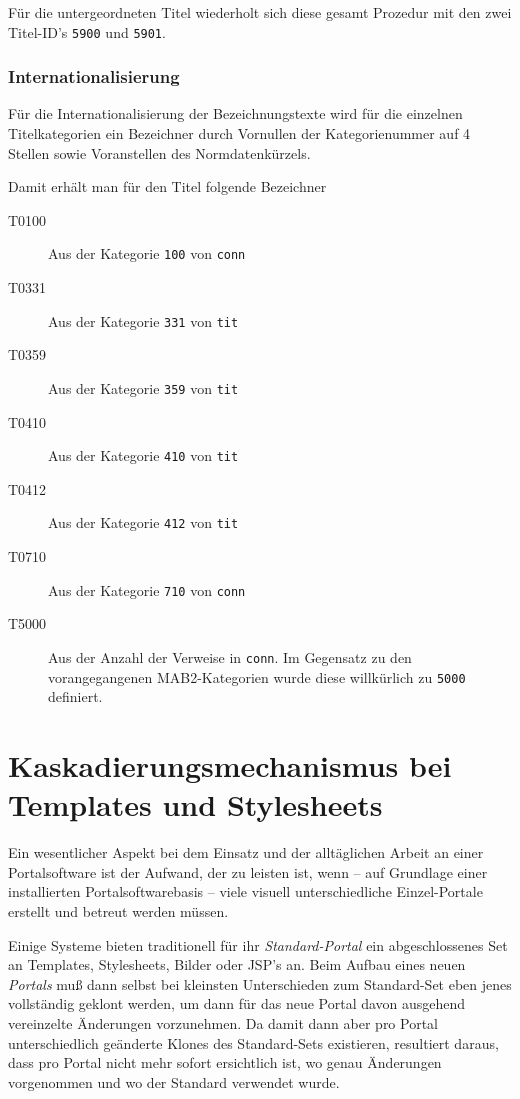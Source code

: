 \documentclass[11pt, twoside, a4paper, BCOR8mm, DIV12, bibtotoc,idxtotoc]{scrbook}
\begin{document}
Für die untergeordneten Titel wiederholt sich diese gesamt Prozedur
mit den zwei Titel-ID's \texttt{5900} und \texttt{5901}.

\subsubsection{Internationalisierung}

Für die Internationalisierung der Bezeichnungstexte wird für die
einzelnen Titelkategorien ein Bezeichner durch Vornullen der
Kategorienummer auf 4 Stellen sowie Voranstellen des Normdatenkürzels.

Damit erhält man für den Titel folgende Bezeichner

\begin{description}
\item[T0100] Aus der Kategorie \texttt{100} von \texttt{conn}
\item[T0331] Aus der Kategorie \texttt{331} von \texttt{tit}
\item[T0359] Aus der Kategorie \texttt{359} von \texttt{tit}
\item[T0410] Aus der Kategorie \texttt{410} von \texttt{tit}
\item[T0412] Aus der Kategorie \texttt{412} von \texttt{tit}
\item[T0710] Aus der Kategorie \texttt{710} von \texttt{conn}
\item[T5000] Aus der Anzahl der Verweise in \texttt{conn}. Im
  Gegensatz zu den vorangegangenen MAB2-Kategorien wurde diese
  willkürlich zu \texttt{5000} definiert.
\end{description}


\section{Kaskadierungsmechanismus bei Templates und Stylesheets}

Ein wesentlicher Aspekt bei dem Einsatz und der alltäglichen Arbeit an
einer Portalsoftware ist der Aufwand, der zu leisten ist, wenn -- auf
Grundlage einer installierten Portalsoftwarebasis -- viele visuell
unterschiedliche Einzel-Portale erstellt und betreut werden müssen.

Einige Systeme bieten traditionell für ihr \emph{Standard-Portal} ein
abgeschlossenes Set an Templates, Stylesheets, Bilder oder JSP's an.
Beim Aufbau eines neuen \emph{Portals} muß dann selbst bei kleinsten
Unterschieden zum Standard-Set eben jenes vollständig geklont werden,
um dann für das neue Portal davon ausgehend vereinzelte Änderungen
vorzunehmen. Da damit dann aber pro Portal unterschiedlich geänderte
Klones des Standard-Sets existieren, resultiert daraus, dass pro
Portal nicht mehr sofort ersichtlich ist, wo genau Änderungen
vorgenommen und wo der Standard verwendet wurde.
\end{document}

